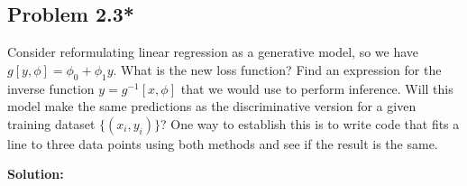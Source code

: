 \documentclass{article}
\begin{document}
    \subsection*{Problem 2.3*}
    Consider reformulating linear regression as a generative model, so we have $g[y, \phi] = \phi_0 + \phi_1 y$. What is the new loss function? Find an expression for the inverse function $y = g^{-1}[x, \phi]$ that we would use to perform inference. Will this model make the same predictions as the discriminative version for a given training dataset $\{(x_i, y_i)\}$? One way to establish this is to write code that fits a line to three data points using both methods and see if the result is the same.

        \vspace{1cm}
        \textbf{Solution:}
        \begin{align*}
        \end{align*}
\end{document}
